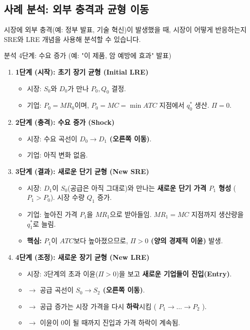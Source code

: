 \documentclass[11pt,a4paper]{book}
\theoremstyle{definition}
\begin{document}
\subsection{사례 분석: 외부 충격과 균형 이동}

시장에 외부 충격(예: 정부 발표, 기술 혁신)이 발생했을 때, 시장이 어떻게 반응하는지 SRE와 LRE 개념을 사용해 분석할 수 있습니다.

\begin{mybox}{분석 4단계: 수요 증가 (예: "이 제품, 암 예방에 효과" 발표)}
\begin{enumerate}
    \item \textbf{1단계 (시작): 초기 장기 균형 (Initial LRE)}
    \begin{itemize}
        \item 시장: $S_0$와 $D_0$가 만나 $P_0, Q_0$ 결정.
        \item 기업: $P_0 = MR_0$이며, $P_0 = MC = \min ATC$ 지점에서 $q_0^*$ 생산. \textbf{$\Pi = 0$}.
    \end{itemize}
    \item \textbf{2단계 (충격): 수요 증가 (Shock)}
    \begin{itemize}
        \item 시장: 수요 곡선이 \textbf{$D_0 \to D_1$ (오른쪽 이동)}.
        \item 기업: 아직 변화 없음.
    \end{itemize}
    \item \textbf{3단계 (결과): 새로운 단기 균형 (New SRE)}
    \begin{itemize}
        \item 시장: $D_1$이 $S_0$(공급은 아직 그대로)와 만나는 \textbf{새로운 단기 가격 $P_1$ 형성} ($P_1 > P_0$). 시장 수량 $Q_1$ 증가.
        \item 기업: 높아진 가격 $P_1$을 $MR_1$으로 받아들임. $MR_1 = MC$ 지점까지 생산량을 $q_1^*$로 늘림.
        \item \textbf{핵심:} $P_1$이 $ATC$보다 높아졌으므로, \textbf{$\Pi > 0$ (양의 경제적 이윤)} 발생.
    \end{itemize}
    \item \textbf{4단계 (조정): 새로운 장기 균형 (New LRE)}
    \begin{itemize}
        \item 시장: 3단계의 초과 이윤($\Pi > 0$)을 보고 \textbf{새로운 기업들이 진입(Entry)}.
        \item $\to$ 공급 곡선이 \textbf{$S_0 \to S_2$ (오른쪽 이동)}.
        \item $\to$ 공급 증가는 시장 가격을 다시 \textbf{하락}시킴 ( $P_1 \to \dots \to P_2$ ).
        \item $\to$ 이윤이 0이 될 때까지 진입과 가격 하락이 계속됨.
    \end{itemize}
\end{enumerate}


\end{mybox}
\end{document}
